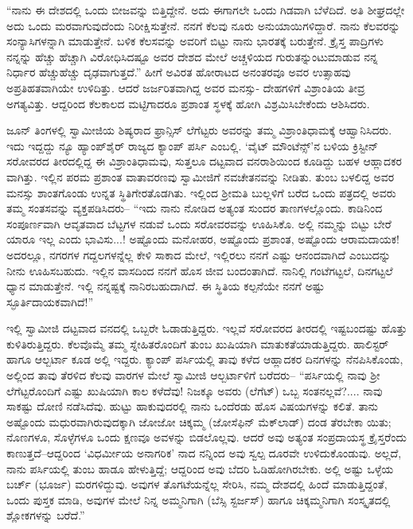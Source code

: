 “ನಾನು ಈ ದೇಶದಲ್ಲಿ ಒಂದು ಬೀಜವನ್ನು ಬಿತ್ತಿದ್ದೇನೆ. ಅದು ಈಗಾಗಲೇ ಒಂದು ಗಿಡವಾಗಿ ಬೆಳೆದಿದೆ. ಅತಿ ಶೀಘ್ರದಲ್ಲೇ ಅದು ಒಂದು ಮರವಾಗುವುದೆಂದು ನಿರೀಕ್ಷಿಸುತ್ತೇನೆ. ನನಗೆ ಕೆಲವು ನೂರು ಅನುಯಾಯಿಗಳಿದ್ದಾರೆ. ನಾನು ಕೆಲವರನ್ನು ಸಂನ್ಯಾಸಿಗಳನ್ನಾಗಿ ಮಾಡುತ್ತೇನೆ. ಬಳಿಕ ಕೆಲಸವನ್ನು ಅವರಿಗೆ ಬಿಟ್ಟು ನಾನು ಭಾರತಕ್ಕೆ ಬರುತ್ತೇನೆ. ಕ್ರೈಸ್ತ ಪಾದ್ರಿಗಳು ನನ್ನನ್ನು ಹೆಚ್ಚು ಹೆಚ್ಚಾಗಿ ವಿರೋಧಿಸಿದಷ್ಟೂ ಅವರ ದೇಶದ ಮೇಲೆ ಅಚ್ಚಳಿಯದ ಗುರುತನ್ನುಂಟುಮಾಡುವ ನನ್ನ ನಿರ್ಧಾರ ಹೆಚ್ಚುಹೆಚ್ಚು ದೃಢವಾಗುತ್ತದೆ.” ಹೀಗೆ ಅವಿರತ ಹೋರಾಟದ ಅನಂತರವೂ ಅವರ ಉತ್ಸಾಹವು ಅಪ್ರತಿಹತವಾಗಿಯೇ ಉಳಿದಿತ್ತು. ಆದರೆ ಜರ್ಜರಿತವಾಗಿದ್ದ ಅವರ ಮನಸ್ಸು- ದೇಹಗಳಿಗೆ ವಿಶ್ರಾಂತಿಯ ತೀವ್ರ ಅಗತ್ಯವಿತ್ತು. ಆದ್ದರಿಂದ ಕೆಲಕಾಲದ ಮಟ್ಟಿಗಾದರೂ ಪ್ರಶಾಂತ ಸ್ಥಳಕ್ಕೆ ಹೋಗಿ ವಿಶ್ರಮಿಸಿಬೇಕೆಂದು ಆಶಿಸಿದರು.

ಜೂನ್ ತಿಂಗಳಲ್ಲಿ ಸ್ವಾಮೀಜಿಯ ಶಿಷ್ಯರಾದ ಫ್ರಾನ್ಸಿಸ್ ಲೆಗೆಟ್ಟರು ಅವರನ್ನು ತಮ್ಮ ವಿಶ್ರಾಂತಿಧಾಮಕ್ಕೆ ಆಹ್ವಾನಿಸಿದರು. ಇದು ಇದ್ದದ್ದು ನ್ಯೂ ಹ್ಯಾಂಪ್​ಶೈರ್ ರಾಜ್ಯದ ಕ್ಯಾಂಪ್ ಪರ್ಸಿ ಎಂಬಲ್ಲಿ. ‘ವೈಟ್ ಮೌಂಟೆನ್ಸ್​’ನ ಬಳಿಯ ಕ್ರಿಸ್ಟೀನ್ ಸರೋವರದ ತೀರದಲ್ಲಿದ್ದ ಈ ವಿಶ್ರಾಂತಿಧಾಮವು, ಸುತ್ತಲೂ ದಟ್ಟವಾದ ವನರಾಶಿಯಿಂದ ಕೂಡಿದ್ದು ಬಹಳ ಆಹ್ಲಾದಕರ ವಾಗಿತ್ತು. ಇಲ್ಲಿನ ಪರಮ ಪ್ರಶಾಂತ ವಾತಾವರಣವು ಸ್ವಾಮೀಜಿಗೆ ನವಚೇತನವನ್ನು ನೀಡಿತು. ತುಂಬ ಬಳಲಿದ್ದ ಅವರ ಮನಸ್ಸು ಶಾಂತಗೊಂಡು ಉನ್ನತ ಸ್ಥಿತಿಗೇರತೊಡಗಿತು. ಇಲ್ಲಿಂದ ಶ್ರೀಮತಿ ಬುಲ್ಲಳಿಗೆ ಬರೆದ ಒಂದು ಪತ್ರದಲ್ಲಿ ಅವರು ತಮ್ಮ ಸಂತಸವನ್ನು ವ್ಯಕ್ತಪಡಿಸಿದರು– “ಇದು ನಾನು ನೋಡಿದ ಅತ್ಯಂತ ಸುಂದರ ತಾಣಗಳಲ್ಲೊಂದು. ಕಾಡಿನಿಂದ ಸಂಪೂರ್ಣವಾಗಿ ಆವೃತವಾದ ಬೆಟ್ಟಗಳ ನಡುವೆ ಒಂದು ಸರೋವರವನ್ನು ಊಹಿಸಿಕೊ. ಅಲ್ಲಿ ನಮ್ಮನ್ನು ಬಿಟ್ಟು ಬೇರೆ ಯಾರೂ ಇಲ್ಲ ಎಂದು ಭಾವಿಸು...! ಅಷ್ಟೊಂದು ಮನೋಹರ, ಅಷ್ಟೊಂದು ಪ್ರಶಾಂತ, ಅಷ್ಟೊಂದು ಆರಾಮದಾಯಕ! ಅದರಲ್ಲೂ, ನಗರಗಳ ಗದ್ದಲಗಳನ್ನೆಲ್ಲ ಕೇಳಿ ಸಾಕಾದ ಮೇಲೆ, ಇಲ್ಲಿರಲು ನನಗೆ ಎಷ್ಟು ಆನಂದವಾಗಿದೆ ಎಂಬುದನ್ನು ನೀನು ಊಹಿಸಬಹುದು. ಇಲ್ಲಿನ ವಾಸದಿಂದ ನನಗೆ ಹೊಸ ಜೀವ ಬಂದಂತಾಗಿದೆ. ನಾನಿಲ್ಲಿ ಗಂಟೆಗಟ್ಟಲೆ, ದಿನಗಟ್ಟಲೆ ಧ್ಯಾನ ಮಾಡುತ್ತೇನೆ. ಇಲ್ಲಿ ನನ್ನಷ್ಟಕ್ಕೆ ನಾನಿರಬಹುದಾಗಿದೆ. ಈ ಸ್ಥಿತಿಯ ಕಲ್ಪನೆಯೇ ನನಗೆ ಅಷ್ಟು ಸ್ಫೂರ್ತಿದಾಯಕವಾಗಿದೆ!”

ಇಲ್ಲಿ ಸ್ವಾಮೀಜಿ ದಟ್ಟವಾದ ವನದಲ್ಲಿ ಒಬ್ಬರೇ ಓಡಾಡುತ್ತಿದ್ದರು. ಇಲ್ಲವೆ ಸರೋವರದ ತೀರದಲ್ಲಿ ಇಷ್ಟಬಂದಷ್ಟು ಹೊತ್ತು ಕುಳಿತಿರುತ್ತಿದ್ದರು. ಕೆಲವೊಮ್ಮೆ ತಮ್ಮ ಸ್ನೇಹಿತರೊಂದಿಗೆ ತುಂಬ ಖುಷಿಯಾಗಿ ಮಾತುಕತೆಯಾಡುತ್ತಿದ್ದರು. ಹಾಲಿಸ್ಟರ್ ಹಾಗೂ ಆಲ್ಬರ್ಟಾ ಕೂಡ ಅಲ್ಲಿ ಇದ್ದರು. ಕ್ಯಾಂಪ್ ಪರ್ಸಿಯಲ್ಲಿ ತಾವು ಕಳೆದ ಆಹ್ಲಾದಕರ ದಿನಗಳನ್ನು ನೆನಪಿಸಿಕೊಂಡು, ಅಲ್ಲಿಂದ ತಾವು ತೆರಳಿದ ಕೆಲವು ವಾರಗಳ ಮೇಲೆ ಸ್ವಾಮೀಜಿ ಆಲ್ಬರ್ಟಾಳಿಗೆ ಬರೆದರು– “ಪರ್ಸಿಯಲ್ಲಿ ನಾವು ಶ್ರೀ ಲೆಗೆಟ್ಟರೊಂದಿಗೆ ಎಷ್ಟು ಖುಷಿಯಾಗಿ ಕಾಲ ಕಳೆದೆವು! ನಿಜಕ್ಕೂ ಅವರು (ಲೆಗೆಟ್​) ಒಬ್ಬ ಸಂತನಲ್ಲವೆ?.... ನಾವು ಸಾಕಷ್ಟು ದೋಣಿ ನಡೆಸಿದೆವು. ಹುಟ್ಟು ಹಾಕುವುದರಲ್ಲಿ ನಾನು ಒಂದೆರಡು ಹೊಸ ವಿಷಯಗಳನ್ನು ಕಲಿತೆ. ತಾನು ಅಷ್ಟೊಂದು ಮಧುರವಾಗಿರುವುದಕ್ಕಾಗಿ ಜೋಜೋ ಚಿಕ್ಕಮ್ಮ (ಜೋಸೆಫಿನ್ ಮೆಕ್​ಲಾಡ್​) ದಂಡ ತೆರಬೇಕಾ ಯಿತು; ನೊಣಗಳೂ, ಸೊಳ್ಳೆಗಳೂ ಒಂದು ಕ್ಷಣವೂ ಅವಳನ್ನು ಬಿಡಲೊಲ್ಲವು. ಆದರೆ ಅವು ಅತ್ಯಂತ ಸಂಪ್ರದಾಯಸ್ಥ ಕ್ರೈಸ್ತರೆಂದು ಕಾಣುತ್ತದೆ–ಆದ್ದರಿಂದ ‘ವಿಧರ್ಮೀಯ ಅನಾಗರಿಕ’ ನಾದ ನನ್ನಿಂದ ಅವು ಸ್ವಲ್ಪ ದೂರವೇ ಉಳಿದುಕೊಂಡುವು. ಅಲ್ಲದೆ, ನಾನು ಪರ್ಸಿಯಲ್ಲಿ ತುಂಬ ಹಾಡೂ ಹೇಳುತ್ತಿದ್ದೆ; ಆದ್ದರಿಂದ ಅವು ಬೆದರಿ ಓಡಿಹೋಗಿರಬೇಕು. ಅಲ್ಲಿ ಅಷ್ಟು ಒಳ್ಳೆಯ ಬರ್ಚ್ (ಭೂರ್ಜ) ಮರಗಳಿದ್ದುವು. ಅವುಗಳ ತೊಗಟೆಯನ್ನೆಲ್ಲ ಸೇರಿಸಿ, ನಮ್ಮ ದೇಶದಲ್ಲಿ ಹಿಂದೆ ಮಾಡುತ್ತಿದ್ದಂತೆ, ಒಂದು ಪುಸ್ತಕ ಮಾಡಿ, ಅವುಗಳ ಮೇಲೆ ನಿನ್ನ ಅಮ್ಮನಿಗಾಗಿ (ಬೆಸ್ಸಿ ಸ್ಟರ್ಜಸ್​) ಹಾಗೂ ಚಿಕ್ಕಮ್ಮನಿಗಾಗಿ ಸಂಸ್ಕೃತದಲ್ಲಿ ಶ್ಲೋಕಗಳನ್ನು ಬರೆದೆ.”

